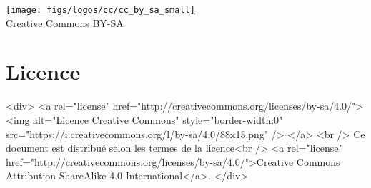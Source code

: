 \ifpdf

    \vfill %
    \begin{center}
        \href{http://creativecommons.org/licenses/by-sa/4.0/}{\texttt{[image: figs/logos/cc/cc\_by\_sa\_small]}}\\
        \small{Creative Commons BY-SA}
    \end{center}

\else

    \section*{Licence}\label{sec:license}

    \begin{rawhtml}

        <div>
            <a rel="license" href="http://creativecommons.org/licenses/by-sa/4.0/">
                <img alt="Licence Creative Commons" style="border-width:0" src="https://i.creativecommons.org/l/by-sa/4.0/88x15.png" />
            </a>
            <br />
            Ce document est distribué selon les termes de la licence<br />
            <a rel="license" href="http://creativecommons.org/licenses/by-sa/4.0/">Creative Commons Attribution-ShareAlike 4.0 International</a>.
        </div>

    \end{rawhtml}

\fi
